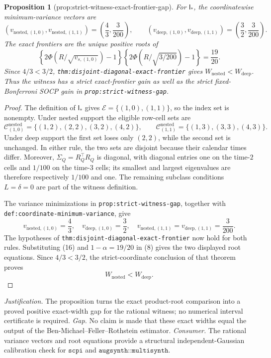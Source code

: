 \documentclass{article}
\newtheorem{proposition}{Proposition}
\begin{document}
\begin{proposition}[prop:strict-witness-exact-frontier-gap]\label{prop:strict-witness-exact-frontier-gap}
For \(\mathsf I_*\), the coordinatewise minimum-variance vectors are
\[
 (v_{\mathrm{nested},(1,0)},v_{\mathrm{nested},(1,1)})
 =\left(\frac43,\frac3{200}\right),
 \qquad
 (v_{\mathrm{deep},(1,0)},v_{\mathrm{deep},(1,1)})
 =\left(\frac32,\frac3{200}\right).
\]
The exact frontiers are the unique positive roots of
\[
 \left\{2\Phi(R/\sqrt{v_{s,(1,0)}})-1\right\}
 \left\{2\Phi(R/\sqrt{3/200})-1\right\}=\frac{19}{20}.
\]
Since \(4/3<3/2\), \texttt{thm:disjoint-diagonal-exact-frontier} gives \(W_{\mathrm{nested}}<W_{\mathrm{deep}}\). Thus the witness has a strict exact-frontier gain as well as the strict fixed-Bonferroni SOCP gain in \texttt{prop:strict-witness-gap}.
\end{proposition}
\begin{proof}
The definition of \(\mathsf I_*\) gives \(\mathcal E=\{(1,0),(1,1)\}\), so
the index set is nonempty.  Under nested support the eligible row-cell sets
are
\[
 \mathcal C^{\mathrm{nested}}_{(1,0)}
 =\{(1,2),(2,2),(3,2),(4,2)\},
 \qquad
 \mathcal C^{\mathrm{nested}}_{(1,1)}
 =\{(1,3),(3,3),(4,3)\}.
\]
Under deep support the first set loses only \((2,2)\), while the second set is
unchanged.  In either rule, the two sets are disjoint because their calendar
times differ.  Moreover, \(\Sigma_Q=R_Q^{\top}R_Q\) is diagonal, with
diagonal entries one on the time-\(2\) cells and \(1/100\) on the time-\(3\)
cells; its smallest and largest eigenvalues are therefore respectively
\(1/100\) and one.  The remaining subclass conditions
\(L=\delta=0\) are part of the witness definition.

The variance minimizations in \texttt{prop:strict-witness-gap}, together with
\texttt{def:coordinate-minimum-variance}, give
\[
 v_{\mathrm{nested},(1,0)}=\frac43,
 \quad v_{\mathrm{deep},(1,0)}=\frac32,
 \quad
 v_{\mathrm{nested},(1,1)}=v_{\mathrm{deep},(1,1)}=\frac3{200}. \tag{16}
\]
The hypotheses of \texttt{thm:disjoint-diagonal-exact-frontier} now hold for
both rules.  Substituting (16) and \(1-\alpha=19/20\) in (8) gives the two
displayed root equations.  Since \(4/3<3/2\), the strict-coordinate conclusion
of that theorem proves
\[
 W_{\mathrm{nested}}<W_{\mathrm{deep}}. \tag{17}
\]
\end{proof}
\par\smallskip\noindent \textit{Justification.} The proposition turns the exact product-root comparison into a proved positive exact-width gap for the rational witness; no numerical interval certificate is required. \textit{Gap.} No claim is made that these exact widths equal the output of the Ben-Michael--Feller--Rothstein estimator. \textit{Consumer.} The rational variance vectors and root equations provide a structural independent-Gaussian calibration check for \(\texttt{scpi}\) and \(\texttt{augsynth::multisynth}\).
\end{document}
